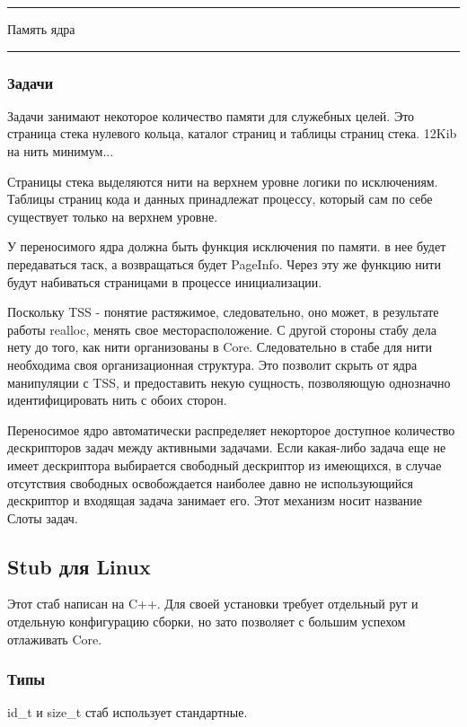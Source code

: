 {\parskip 0pt \hrule \vrule Память ядра\hfill \vrule \hrule}

\subsubsection{Задачи}

Задачи занимают некоторое количество памяти для служебных целей. Это страница
стека нулевого кольца, каталог страниц и таблицы страниц стека. 12Kib на нить
минимум...

Страницы стека выделяются нити на верхнем уровне логики по исключениям. Таблицы
страниц кода и данных принадлежат процессу, который сам по себе существует
только на верхнем уровне.

У переносимого ядра должна быть функция исключения по памяти. в нее будет
передаваться таск, а возвращаться будет PageInfo. Через эту же функцию нити
будут набиваться страницами в процессе инициализации.

Поскольку TSS - понятие растяжимое, следовательно, оно может, в результате
работы realloc, менять свое месторасположение. С другой стороны стабу дела нету
до того, как нити организованы в Core. Следовательно в стабе для нити необходима
своя организационная структура. Это позволит скрыть от ядра манипуляции с TSS, и
предоставить некую сущность, позволяющую однозначно идентифицировать нить с
обоих сторон.

Переносимое ядро автоматически распределяет некорторое доступное количество
дескрипторов задач между активными задачами. Если какая-либо задача еще не имеет
дескриптора выбирается свободный дескриптор из имеющихся, в случае отсутствия
свободных освобождается наиболее давно не использующийся дескриптор и входящая
задача занимает его. Этот механизм носит название Слоты задач.

\subsection{Stub для Linux}

Этот стаб написан на C++. Для своей установки требует отдельный рут и отдельную
конфигурацию сборки, но зато позволяет с большим успехом отлаживать Core.

\subsubsection{Типы}

id\_t и size\_t стаб использует стандартные.
